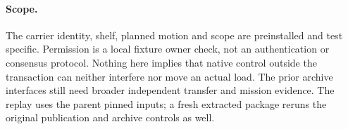 \documentclass[11pt]{article}
\begin{document}
\paragraph{Scope.}
The carrier identity, shelf, planned motion and scope are
preinstalled and test specific. Permission is a local
fixture owner check, not an authentication or consensus
protocol. Nothing here implies that native control outside
the transaction can neither interfere nor move an actual load.
The prior archive interfaces still need broader independent
transfer and mission evidence. The replay uses the parent
pinned inputs; a fresh extracted package reruns the original
publication and archive controls as well.
\end{document}
